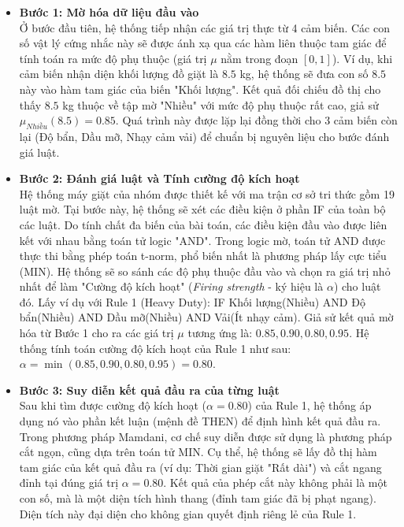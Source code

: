 \documentclass[12pt, a4paper]{article}
\begin{document}
\begin{itemize}
    \item \textbf{Bước 1: Mờ hóa dữ liệu đầu vào}\\
    Ở bước đầu tiên, hệ thống tiếp nhận các giá trị thực từ 4 cảm biến. Các con số vật lý cứng nhắc này sẽ được ánh xạ qua các hàm liên thuộc tam giác để tính toán ra mức độ phụ thuộc (giá trị $\mu$ nằm trong đoạn $[0, 1]$). Ví dụ, khi cảm biến nhận diện khối lượng đồ giặt là $8.5$ kg, hệ thống sẽ đưa con số $8.5$ này vào hàm tam giác của biến "Khối lượng". Kết quả đối chiếu đồ thị cho thấy $8.5$ kg thuộc về tập mờ "Nhiều" với mức độ phụ thuộc rất cao, giả sử $\mu_{Nhiều}(8.5) = 0.85$. Quá trình này được lặp lại đồng thời cho 3 cảm biến còn lại (Độ bẩn, Dầu mỡ, Nhạy cảm vải) để chuẩn bị nguyên liệu cho bước đánh giá luật.
    
    \item \textbf{Bước 2: Đánh giá luật và Tính cường độ kích hoạt}\\
    Hệ thống máy giặt của nhóm được thiết kế với ma trận cơ sở tri thức gồm 19 luật mờ. Tại bước này, hệ thống sẽ xét các điều kiện ở phần IF của toàn bộ các luật. Do tính chất đa biến của bài toán, các điều kiện đầu vào được liên kết với nhau bằng toán tử logic "AND". Trong logic mờ, toán tử AND được thực thi bằng phép toán t-norm, phổ biến nhất là phương pháp lấy cực tiểu (MIN). Hệ thống sẽ so sánh các độ phụ thuộc đầu vào và chọn ra giá trị nhỏ nhất để làm "Cường độ kích hoạt" (\textit{Firing strength} - ký hiệu là $\alpha$) cho luật đó. Lấy ví dụ với Rule 1 (Heavy Duty): IF Khối lượng(Nhiều) AND Độ bẩn(Nhiều) AND Dầu mỡ(Nhiều) AND Vải(Ít nhạy cảm). Giả sử kết quả mờ hóa từ Bước 1 cho ra các giá trị $\mu$ tương ứng là: $0.85, 0.90, 0.80, 0.95$. Hệ thống tính toán cường độ kích hoạt của Rule 1 như sau: $\alpha = \min(0.85, 0.90, 0.80, 0.95) = 0.80$.
    
    \item \textbf{Bước 3: Suy diễn kết quả đầu ra của từng luật}\\
    Sau khi tìm được cường độ kích hoạt ($\alpha = 0.80$) của Rule 1, hệ thống áp dụng nó vào phần kết luận (mệnh đề THEN) để định hình kết quả đầu ra. Trong phương pháp Mamdani, cơ chế suy diễn được sử dụng là phương pháp cắt ngọn, cũng dựa trên toán tử MIN. Cụ thể, hệ thống sẽ lấy đồ thị hàm tam giác của kết quả đầu ra (ví dụ: Thời gian giặt "Rất dài") và cắt ngang đỉnh tại đúng giá trị $\alpha = 0.80$. Kết quả của phép cắt này không phải là một con số, mà là một diện tích hình thang (đỉnh tam giác đã bị phạt ngang). Diện tích này đại diện cho không gian quyết định riêng lẻ của Rule 1.
    

\end{itemize}
\end{document}
